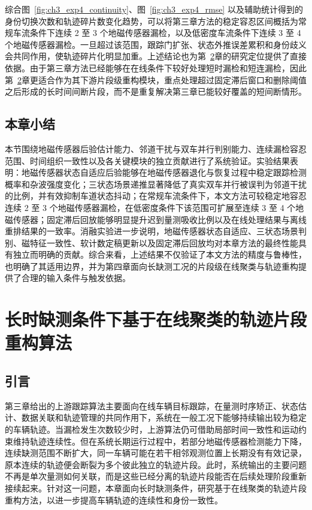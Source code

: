 \documentclass{xdupgthesis}
\begin{document}
综合图~\ref{fig:ch3_exp4_continuity}、图~\ref{fig:ch3_exp4_rmse} 以及辅助统计得到的身份切换次数和轨迹碎片数变化趋势，可以将第三章方法的稳定容忍区间概括为常规车流条件下连续 2 至 3 个地磁传感器漏检，以及低密度车流条件下连续 3 至 4 个地磁传感器漏检。一旦超过该范围，跟踪门扩张、状态外推误差累积和身份歧义会共同作用，使轨迹碎片化明显加重。上述结论也为第~\ref{chap:cedas_fragment}章的研究定位提供了直接依据。由于第三章方法已经能够在在线条件下较好处理短时漏检和短连漏检，因此第~\ref{chap:cedas_fragment}章更适合作为其下游片段级重构模块，重点处理超过固定滞后窗口和删除阈值之后形成的长时间间断片段，而不是重复解决第三章已能较好覆盖的短间断情形。

\section{本章小结}


本节围绕地磁传感器后验估计能力、邻道干扰与双车并行判别能力、连续漏检容忍范围、时间组织一致性以及各关键模块的独立贡献进行了系统验证。实验结果表明：地磁传感器状态自适应后验能够在地磁传感器退化与恢复过程中稳定跟踪检测概率和杂波强度变化；三状态场景递推显著降低了真实双车并行被误判为邻道干扰的比例，并有效抑制车道状态抖动；在常规车流条件下，本文方法可较稳定地容忍连续 2 至 3 个地磁传感器漏检，在低密度条件下该范围可扩展至连续 3 至 4 个地磁传感器；固定滞后回放能够明显提升迟到量测吸收比例以及在线处理结果与离线重排结果的一致率。消融实验进一步说明，地磁传感器状态自适应、三状态场景判别、磁特征一致性、软计数定稿更新以及固定滞后回放均对本章方法的最终性能具有独立而明确的贡献。综合来看，上述结果不仅验证了本文方法的精度与鲁棒性，也明确了其适用边界，并为第四章面向长缺测工况的片段级在线聚类与轨迹重构提供了合理的输入条件与触发依据。


\chapter{长时缺测条件下基于在线聚类的轨迹片段重构算法}
\label{chap:cedas_fragment}

\graphicspath{
	{code/chapter4/experiment123/chapter4_results/exp1/}
	{code/chapter4/experiment123/chapter4_results/exp2/}
	{code/chapter4/experiment123/chapter4_results/exp3/}
}

\section{引言}

第三章给出的上游跟踪算法主要面向在线车辆目标跟踪，在量测时序矫正、状态估计、数据关联和轨迹管理的共同作用下，系统在一般工况下能够持续输出较为稳定的车辆轨迹。当漏检发生次数较少时，上游算法仍可借助局部时间一致性和运动约束维持轨迹连续性。但在系统长期运行过程中，若部分地磁传感器检测能力下降，连续缺测范围不断扩大，同一车辆可能在若干相邻观测位置上长期没有有效记录，原本连续的轨迹便会断裂为多个彼此独立的轨迹片段。此时，系统输出的主要问题不再是单次量测如何关联，而是这些已经分离的轨迹片段能否在后续处理阶段重新接续起来。针对这一问题，本章面向长时缺测条件，研究基于在线聚类的轨迹片段重构方法，以进一步提高车辆轨迹的连续性和身份一致性。
\end{document}
